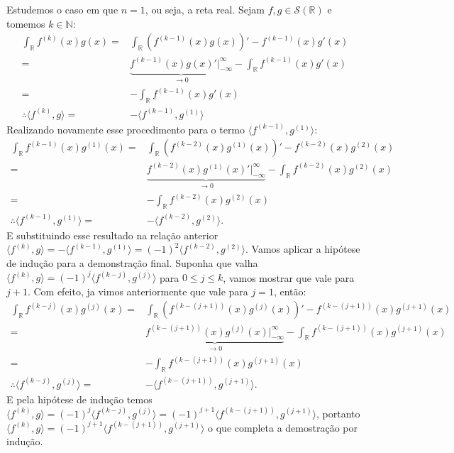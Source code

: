 \documentclass{article}
\begin{document}
\begin{enumerate}
		Estudemos o caso em que $n = 1$, ou seja, a reta real. Sejam $f, g \in \mathcal{S}(\mathbb{R})$ e tomemos $k \in \mathbb{N}$:
		$$
		\begin{aligned}
		\int_{\mathbb{R}} f^{(k)}(x)g(x) = & \int_{\mathbb{R}} (f^{(k-1)}(x)g(x))' - f^{(k-1)}(x)g'(x)
		\\ 
		= & \underbrace{ f^{(k-1)}(x)g(x)'\Big|^{\infty}_{-\infty} }_{\to 0}- \int_{\mathbb{R}}  f^{(k-1)}(x)g'(x)
		\\ 
		= & -\int_{\mathbb{R}}  f^{(k-1)}(x)g'(x) \;
		\\
		 \therefore \langle f^{(k)},g \rangle = & - \langle f^{(k-1)},g^{(1)} \rangle
		\end{aligned}
		$$
		Realizando novamente esse procedimento para o termo $\langle f^{(k-1)},g^{(1)} \rangle$:
		$$
		\begin{aligned}
		\int_{\mathbb{R}} f^{(k-1)}(x)g^{(1)}(x) = & \int_{\mathbb{R}} (f^{(k-2)}(x)g^{(1)}(x))' - f^{(k-2)}(x)g^{(2)}(x)
		\\ 
		= & \underbrace{ f^{(k-2)}(x)g^{(1)}(x)'\Big|^{\infty}_{-\infty} }_{\to 0}- \int_{\mathbb{R}}  f^{(k-2)}(x)g^{(2)} (x)
		\\ 
		= & -\int_{\mathbb{R}}  f^{(k-2)}(x)g^{(2)} (x) \;  
		\\
		\therefore \langle f^{(k-1)},g^{(1)} \rangle = & - \langle f^{(k-2)},g^{(2)} \rangle.
		\end{aligned}
		$$
		E substituindo esse resultado na relação anterior $\langle f^{(k)},g \rangle = - \langle f^{(k-1)},g^{(1)} \rangle = (-1)^{2} \langle f^{(k-2)},g^{(2)} \rangle$. Vamos aplicar a hipótese de indução para a demonstração final. Suponha que valha $\langle f^{(k)},g \rangle = (-1)^{j} \langle f^{(k-j)},g^{(j)} \rangle$ para $0 \leq j \leq k$, vamos mostrar que vale para $j+1$. Com efeito, ja vimos anteriormente que vale para $j=1$, então:
		$$
		\begin{aligned}
		\int_{\mathbb{R}} f^{(k-j)}(x)g^{(j)}(x) = & \int_{\mathbb{R}} (f^{(k-(j+1))}(x)g^{(j)}(x))' - f^{(k-(j+1))}(x)g^{(j+1)}(x)
		\\ 
		= & \underbrace{ f^{(k-(j+1))}(x)g^{(j)}(x)\Big|^{\infty}_{-\infty} }_{\to 0}- \int_{\mathbb{R}}  f^{(k-(j+1))}(x)g^{(j+1)}(x)
		\\ 
		= & -\int_{\mathbb{R}}  f^{(k-(j+1))}(x)g^{(j+1)}(x) \; 
		\\
		\therefore \langle f^{(k-j)},g^{(j)} \rangle = & - \langle f^{(k-(j+1))},g^{(j+1)} \rangle.
		\end{aligned}
		$$
		E pela hipótese de indução temos $\langle f^{(k)},g \rangle = (-1)^{j} \langle f^{(k-j)},g^{(j)} \rangle = (-1)^{j+1}\langle f^{(k-(j+1))},g^{(j+1)} \rangle$, portanto $\langle f^{(k)},g \rangle = (-1)^{j+1}\langle f^{(k-(j+1))},g^{(j+1)} \rangle$ o que completa a demostração por indução. 
		

\end{enumerate}
\end{document}
